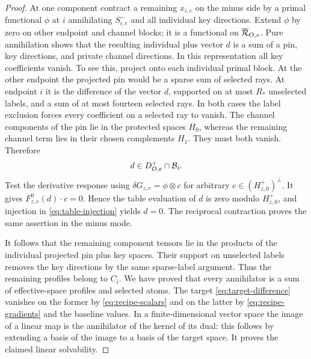 \begin{proof}
At one component contract a remaining $x_{i,e}$ on the minus
side by a primal functional $\phi$ at $i$ annihilating
$S_{i,e}^-$ and all individual key directions.  Extend $\phi$
by zero on other endpoint and channel blocks; it is a
functional on $\overline{\mathcal R}_{O,e}$.  Pure annihilation shows
that the resulting individual plus vector $d$ is a sum of a
pin, key directions, and private channel directions.  In
this representation all key coefficients vanish.  To see
this, project onto each individual primal block.  At the
other endpoint the projected pin would be a sparse sum of
selected rays.  At endpoint $i$ it is the difference of the
vector $d$, supported on at most $R_*$ unselected labels, and
a sum of at most fourteen selected rays.  In both cases the
label exclusion forces every coefficient on a selected ray to vanish.  The
channel components of the pin lie in the protected spaces
$H_0$, whereas the remaining channel term lies in their
chosen complements $H_1$.  They must both vanish.  Therefore
\[
 d\in D_{O,e}^+\cap\mathcal B_i.
\]
Test the derivative response using
$\delta G_{z,e}=\phi\otimes c$ for arbitrary
$c\in(H_{z,0}^+)^\perp$.  It gives
$F_{z,e}^0(d)\cdot c=0$.  Hence the table evaluation of $d$
is zero modulo $H_{z,0}^+$, and injection in
\eqref{eq:table-injection} yields $d=0$.
The reciprocal contraction proves the same assertion in the
minus mode.

It follows that the remaining component tensors lie in the
products of the individual projected pin plus key spaces.
Their support on unselected labels removes the key directions by the
same sparse-label argument.  Thus the remaining profiles
belong to $C_i$.  We have proved that every annihilator is a
sum of effective-space profiles and selected atoms.  The target
\eqref{eq:target-difference} vanishes on the former by
\eqref{eq:recipe-scalars} and on the latter by
\eqref{eq:recipe-gradients} and the baseline values.
In a finite-dimensional vector space the image of a linear
map is the annihilator of the kernel of its dual: this
follows by extending a basis of the image to a basis of the
target space.  It proves the claimed linear solvability.


\end{proof}
